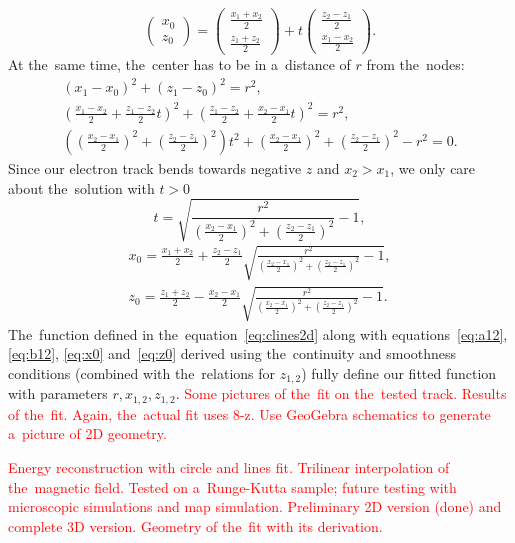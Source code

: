 				\begin{equation}
					\begin{pmatrix} x_0\\ z_0 \end{pmatrix} = \begin{pmatrix} \frac{x_1+x_2}{2}\\ \frac{z_1+z_2}{2} \end{pmatrix} + t \begin{pmatrix} \frac{z_2-z_1}{2}\\ \frac{x_1-x_2}{2} \end{pmatrix}.
				\end{equation}
			At the~same time, the~center has to be in a~distance of $r$ from the~nodes:
				\begin{gather}
					(x_1-x_0)^2 + (z_1-z_0)^2 = r^2,\\
					\left(\frac{x_1-x_2}{2}+\frac{z_1-z_2}{2}t\right)^2 + \left(\frac{z_1-z_2}{2}+\frac{x_2-x_1}{2}t\right)^2 = r^2,\\
					\left(\left(\frac{x_2-x_1}{2}\right)^2+\left(\frac{z_2-z_1}{2}\right)^2\right)t^2+\left(\frac{x_2-x_1}{2}\right)^2+\left(\frac{z_2-z_1}{2}\right)^2-r^2=0.
				\end{gather}
			Since our electron track bends towards negative $z$ and $x_2 > x_1$, we only care about the~solution with $t>0$
				\begin{equation}
					t = \sqrt{\frac{r^2}{\left(\frac{x_2-x_1}{2}\right)^2+\left(\frac{z_2-z_1}{2}\right)^2}-1},
				\end{equation}
				\begin{align}
					x_0 = \frac{x_1+x_2}{2} + \frac{z_2-z_1}{2} \sqrt{\frac{r^2}{\left(\frac{x_2-x_1}{2}\right)^2+\left(\frac{z_2-z_1}{2}\right)^2}-1},\label{eq:x0}\\
					z_0 = \frac{z_1+z_2}{2} - \frac{x_2-x_1}{2} \sqrt{\frac{r^2}{\left(\frac{x_2-x_1}{2}\right)^2+\left(\frac{z_2-z_1}{2}\right)^2}-1}.\label{eq:z0}
				\end{align}
			The~function defined in the~equation~\ref{eq:clines2d} along with equations~\ref{eq:a12}, \ref{eq:b12}, \ref{eq:x0} and~\ref{eq:z0} derived using the~continuity and smoothness conditions (combined with the~relations for $z_{1,2}$) fully define our fitted function with parameters $r,x_{1,2},z_{1,2}$. \textcolor{red}{Some pictures of the~fit on the~tested track. Results of the~fit. Again, the~actual fit uses 8-z. Use GeoGebra schematics to generate a~picture of 2D geometry.}
			
			\textcolor{red}{Energy reconstruction with circle and lines fit. Trilinear interpolation of the~magnetic field. Tested on a~Runge-Kutta sample; future testing with microscopic simulations and map simulation. Preliminary 2D version (done) and complete 3D version. Geometry of the~fit with its derivation.}
			
